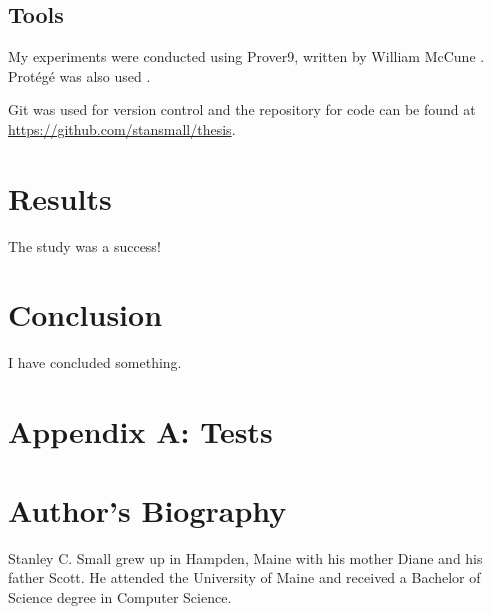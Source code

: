 \documentclass{article}
\begin{document}
\subsection{Tools}
My experiments were conducted using Prover9, written by William McCune \cite{mccune2005prover9}. Prot{\'e}g{\'e} was also used \cite{gennari2003evolution}.

Git was used for version control and the repository for code can be found at \url{https://github.com/stansmall/thesis}.

\section{Results}
The study was a success!
\section{Conclusion}
I have concluded something. 
\nocite{*}
\newpage
\printbibliography
\newpage
\section{Appendix A: Tests}
\newpage
\section{Author's Biography}
Stanley C. Small grew up in Hampden, Maine with his mother Diane and his father Scott. He attended the University of Maine and received a Bachelor of Science degree in Computer Science. 
\end{document}
